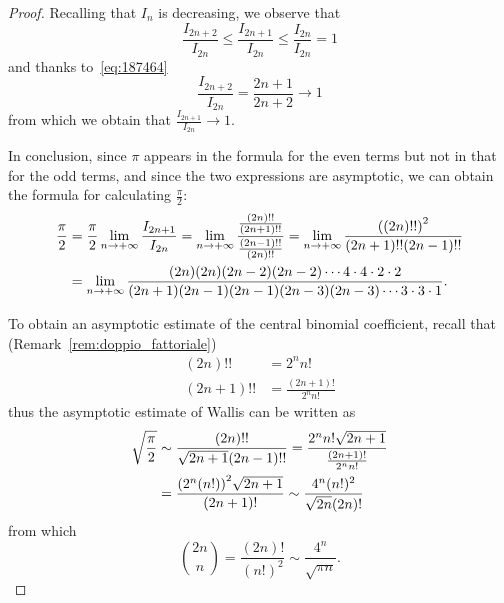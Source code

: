 \begin{proof}
Recalling that $I_n$ is decreasing, we observe that
\[
  \frac{I_{2n+2}}{I_{2n}}
  \le \frac{I_{2n+1}}{I_{2n}}
  \le \frac{I_{2n}}{I_{2n}} = 1
\]
and thanks to~\eqref{eq:187464}
\[
 \frac{I_{2n+2}}{I_{2n}}
 = \frac{2n+1}{2n+2} \to 1
\]
from which we obtain that $\frac{I_{2n+1}}{I_{2n}}\to 1$.

In conclusion, since $\pi$ appears in the formula for the even terms but not in
that for the odd terms, and since the two expressions are asymptotic, we can
obtain the formula for calculating $\frac \pi 2$:
\begin{align*}
\frac{\pi}{2}
&= \frac{\pi}{2} \lim_{n\to +\infty} \frac{I_{2n+1}}{I_{2n}}
= \lim_{n\to +\infty} \frac{\frac{(2n)!!}{(2n+1)!!}}{\frac{(2n-1)!!}{(2n)!!}}
= \lim_{n\to +\infty} \frac{{\left( (2n)!! \right)}^2}{(2n+1)!!(2n-1)!!} \\
&= \lim_{n\to +\infty} \frac{(2n)(2n)(2n-2)(2n-2) \cdots 4\cdot 4 \cdot 2 \cdot
2}
  {(2n+1)(2n-1)(2n-1)(2n-3)(2n-3)\cdots 3 \cdot 3 \cdot 1}.
\end{align*}

To obtain an asymptotic estimate of the central binomial coefficient, recall
that (Remark~\ref{rem:doppio_fattoriale})
\begin{align*}
  (2n)!! &= 2^n n! \\
  (2n+1)!! &= \frac{(2n+1)!}{2^n n!}
\end{align*}
thus the asymptotic estimate of Wallis can be written as
\begin{align*}
 \sqrt{\frac{\pi}{2}}
 &\sim \frac{(2n)!!}{\sqrt{2n+1}(2n-1)!!}
  = \frac{2^n n!\sqrt{2n+1}}{\frac{(2n+1)!}{2^n n!}} \\
 &= \frac{{\left( 2^n (n!) \right)}^2 \sqrt{2n+1}}{(2n+1)!} 
 \sim \frac{4^n (n!)^2}{\sqrt{2n}(2n)!}
\end{align*}
from which
\[
{2n \choose n}
= \frac{(2n)!}{(n!)^2}
\sim \frac{4^n}{\sqrt{\pi n}}.
\]
\end{proof}

